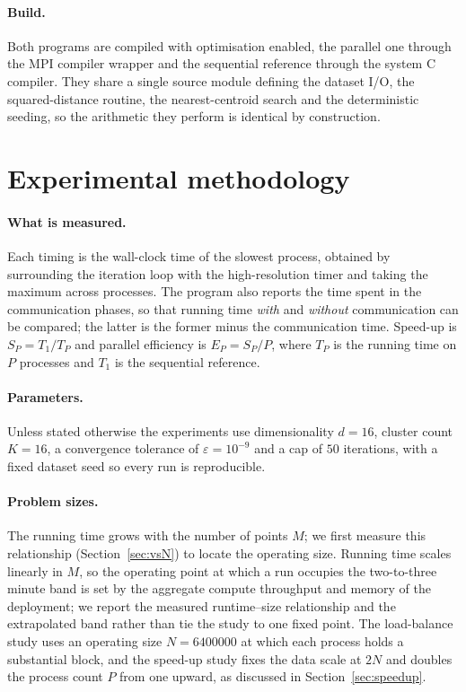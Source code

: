 \documentclass[11pt,a4paper]{article}
\begin{document}
\paragraph{Build.}
Both programs are compiled with optimisation enabled, the parallel one through
the MPI compiler wrapper and the sequential reference through the system C
compiler. They share a single source module defining the dataset I/O, the
squared-distance routine, the nearest-centroid search and the deterministic
seeding, so the arithmetic they perform is identical by construction.

\section{Experimental methodology}
\label{sec:method}

\paragraph{What is measured.}
Each timing is the wall-clock time of the slowest process, obtained by
surrounding the iteration loop with the high-resolution timer and taking the
maximum across processes. The program also reports the time spent in the
communication phases, so that running time \emph{with} and \emph{without}
communication can be compared; the latter is the former minus the communication
time. Speed-up is $S_P=T_1/T_P$ and parallel efficiency is $E_P=S_P/P$, where
$T_P$ is the running time on $P$ processes and $T_1$ is the sequential
reference.

\paragraph{Parameters.}
Unless stated otherwise the experiments use dimensionality $d=16$, cluster count
$K=16$, a convergence tolerance of $\varepsilon=10^{-9}$ and a cap of $50$
iterations, with a fixed dataset seed so every run is reproducible.

\paragraph{Problem sizes.}
The running time grows with the number of points $M$; we first measure this
relationship (Section~\ref{sec:vsN}) to locate the operating size. Running time
scales linearly in $M$, so the operating point at which a run occupies the
two-to-three minute band is set by the aggregate compute throughput and memory
of the deployment; we report the measured runtime--size relationship and the
extrapolated band rather than tie the study to one fixed point. The load-balance
study uses an operating size $N=\num{6400000}$ at which each process holds a
substantial block, and the speed-up study fixes the data scale at $2N$ and
doubles the process count $P$ from one upward, as discussed in
Section~\ref{sec:speedup}.
\end{document}
